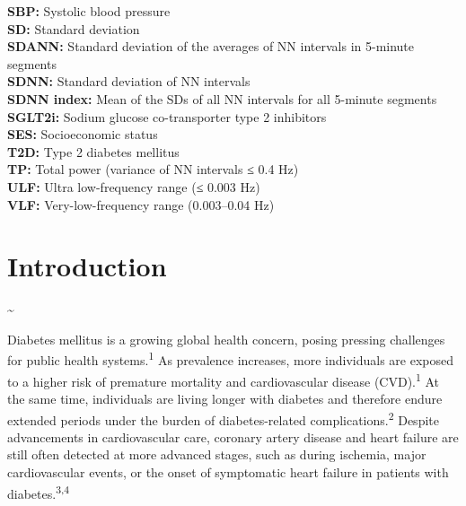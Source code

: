 \documentclass[
  a4paper,
  headsepline=true,
  open=any]{scrbook}
\begin{document}
\textbf{SBP:} Systolic blood pressure\\
\textbf{SD:} Standard deviation\\
\textbf{SDANN:} Standard deviation of the averages of NN intervals in
5-minute segments\\
\textbf{SDNN:} Standard deviation of NN intervals\\
\textbf{SDNN index:} Mean of the SDs of all NN intervals for all
5-minute segments\\
\textbf{SGLT2i:} Sodium glucose co-transporter type 2 inhibitors\\
\textbf{SES:} Socioeconomic status\\
\textbf{T2D:} Type 2 diabetes mellitus\\
\textbf{TP:} Total power (variance of NN intervals ≤ 0.4 Hz)\\
\textbf{ULF:} Ultra low-frequency range (≤ 0.003 Hz)\\
\textbf{VLF:} Very-low-frequency range (0.003--0.04 Hz)


\hypertarget{introduction}{%
\chapter{Introduction}\label{introduction}}

\newpage

\thispagestyle{empty}

\textasciitilde{} \newpage

Diabetes mellitus is a growing global health concern, posing pressing
challenges for public health systems.\textsuperscript{1} As prevalence
increases, more individuals are exposed to a higher risk of premature
mortality and cardiovascular disease (CVD).\textsuperscript{1} At the
same time, individuals are living longer with diabetes and therefore
endure extended periods under the burden of diabetes-related
complications.\textsuperscript{2} Despite advancements in cardiovascular
care, coronary artery disease and heart failure are still often detected
at more advanced stages, such as during ischemia, major cardiovascular
events, or the onset of symptomatic heart failure in patients with
diabetes.\textsuperscript{3,4}
\end{document}
